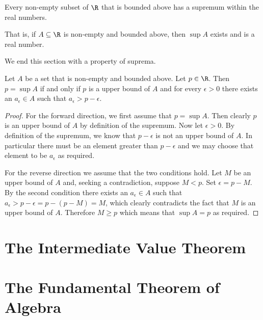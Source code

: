\begin{axiom}[Completeness]\label{axiom-completeness}
    Every non-empty subset of $\R$ that is bounded above has a supremum within the real numbers.

    That is, if $A \subseteq \R$ is non-empty and bounded above, then $\sup A$ exists and is a real number.
\end{axiom}

We end this section with a property of suprema.
\begin{proposition}\label{prop-identifying-suprema}
    Let $A$ be a set that is non-empty and bounded above. Let $p \in \R$. Then $p = \sup A$ if and only if $p$ is a upper bound of $A$ and for every $\epsilon > 0$ there exists an $a_\epsilon \in A$ such that $a_\epsilon > p - \epsilon$.
\end{proposition}
\begin{proof}
    For the forward direction, we first assume that $p = \sup A$. Then clearly $p$ is an upper bound of $A$ by definition of the supremum. Now let $\epsilon > 0$. By definition of the supremum, we know that $p - \epsilon$ is not an upper bound of $A$. In particular there must be an element greater than $p - \epsilon$ and we may choose that element to be $a_\epsilon$ as required.

    For the reverse direction we assume that the two conditions hold. Let $M$ be an upper bound of $A$ and, seeking a contradiction, suppose $M < p$. Set $\epsilon = p - M$. By the second condition there exists an $a_\epsilon \in A $ such that $a_\epsilon > p - \epsilon = p - (p - M) = M$, which clearly contradicts the fact that $M$ is an upper bound of $A$. Therefore $M \geq p$ which means that $\sup A = p$ as required.
\end{proof}

\section{The Intermediate Value Theorem}

\section{The Fundamental Theorem of Algebra}
